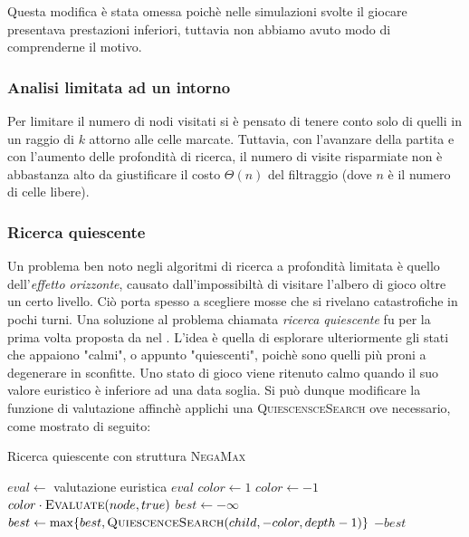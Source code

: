 \documentclass{article}
\begin{document}
Questa modifica \`e stata omessa poich\`e nelle simulazioni svolte il
giocare presentava prestazioni inferiori, tuttavia non abbiamo avuto modo di
comprenderne il motivo.

\subsubsection{Analisi limitata ad un intorno}

Per limitare il numero di nodi visitati si \`e pensato di tenere conto solo di
quelli in un raggio di $k$ attorno alle celle marcate. Tuttavia, con l'avanzare
della partita e con l'aumento delle profondit\`a di ricerca, il numero di visite
risparmiate non \`e abbastanza alto da giustificare il costo $\Theta(n)$ del
filtraggio (dove $n$ \`e il numero di celle libere).

\subsubsection{Ricerca quiescente}

Un problema ben noto negli algoritmi di ricerca a profondit\`a limitata \`e
quello dell'\emph{effetto orizzonte}, causato dall'impossibilt\`a 
di visitare l'albero di gioco oltre un certo livello. Ci\`o porta spesso a scegliere 
mosse che si rivelano catastrofiche in pochi turni. Una soluzione al problema
chiamata \emph{ricerca quiescente} \cite{quiescence} fu per la prima volta
proposta da \citeauthor{quiescence} nel \citeyear{quiescence}.
L'idea \`e quella di esplorare ulteriormente gli stati che appaiono "calmi", o
appunto "quiescenti", poich\`e sono quelli pi\`u proni a degenerare in sconfitte.
Uno stato di gioco viene ritenuto calmo quando il suo valore euristico \`e inferiore
ad una data soglia. Si pu\`o dunque modificare la funzione di valutazione affinch\`e
applichi una \textsc{QuiescensceSearch} ove necessario, come mostrato di seguito:

\begin{algorithm}[H]
  \caption{Ricerca quiescente con struttura \textsc{NegaMax}}
  \label{qs}
  \begin{algorithmic}[0]
      \State $eval \gets $ valutazione euristica
        \State \Return $eval$
      \Else
        \State $color \gets 1$
          \State $color \gets -1$
        \EndIf
        \State \Return {}
      \EndIf
    \EndProcedure
    \Statex
      \State \Return $color \cdot \Call{Evaluate}{node, true}$
    \EndIf
    \State $best \gets -\infty$
      \State $best \gets \max\{best, \Call{QuiescenceSearch}{child, -color, depth-1}\}$
    \EndFor
    \State \Return $-best$
    \EndProcedure
  \end{algorithmic}
\end{algorithm}
\end{document}
